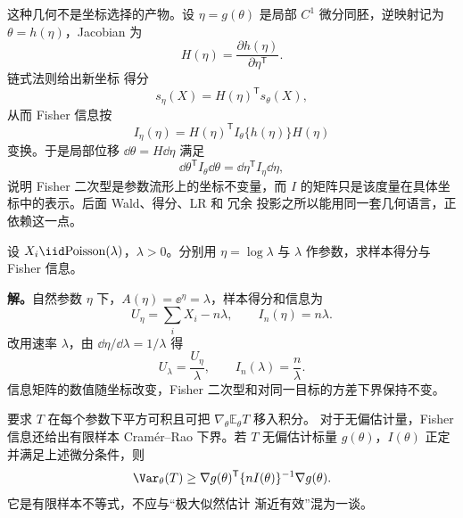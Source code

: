 \begin{proposition}
这种几何不是坐标选择的产物。设 $\eta=g(\theta)$ 是局部 $C^1$ 微分同胚，逆映射记为 $\theta=h(\eta)$，Jacobian 为
\[
 H(\eta)=\frac{\partial h(\eta)}{\partial\eta^{\mathsf T}}.
\]
链式法则给出新坐标 得分
\[
 s_\eta(X)
 =H(\eta)^{\mathsf T}s_\theta(X),
\]
从而 Fisher 信息按
\begin{equation}\label{eq:math-stat-fisher-reparameterization}
 I_\eta(\eta)
 =H(\eta)^{\mathsf T}I_\theta\{h(\eta)\}H(\eta)
\end{equation}
变换。于是局部位移 $\dd\theta=H\dd\eta$ 满足
\[
 \dd\theta^{\mathsf T}I_\theta\dd\theta
 =\dd\eta^{\mathsf T}I_\eta\dd\eta,
\]
说明 Fisher 二次型是参数流形上的坐标不变量，而 $I$ 的矩阵只是该度量在具体坐标中的表示。后面 Wald、得分、LR 和 冗余 投影之所以能用同一套几何语言，正依赖这一点。
\end{proposition}


\begin{workedexample}
设 $X_i\iid\mathrm{Poisson}(\lambda)$，$\lambda>0$。分别用 $\eta=\log\lambda$ 与 $\lambda$ 作参数，求样本得分与 Fisher 信息。

\textbf{解。}自然参数 $\eta$ 下，$A(\eta)=\ee^\eta=\lambda$，样本得分和信息为
\[
 U_\eta=\sum_iX_i-n\lambda,\qquad I_n(\eta)=n\lambda.
\]
改用速率 $\lambda$，由 $\dd\eta/\dd\lambda=1/\lambda$ 得
\[
 U_\lambda=\frac{U_\eta}{\lambda},\qquad I_n(\lambda)=\frac n\lambda.
\]
信息矩阵的数值随坐标改变，Fisher 二次型和对同一目标的方差下界保持不变。
\end{workedexample}

\begin{theorem}
要求 $T$ 在每个参数下平方可积且可把 $\nabla_\theta\mathbb E_\theta T$ 移入积分。
对于无偏估计量，Fisher 信息还给出有限样本 Cramér--Rao 下界。若 $T$ 无偏估计标量 $g(\theta)$，$I(\theta)$ 正定并满足上述微分条件，则
\begin{equation}\label{eq:math-stat-cramer-rao}
 \Var_\theta(T)
 \ge
 \nabla g(\theta)^{\mathsf T}
 \{nI(\theta)\}^{-1}
 \nabla g(\theta).
\end{equation}
它是有限样本不等式，不应与“极大似然估计 渐近有效”混为一谈。
\end{theorem}


